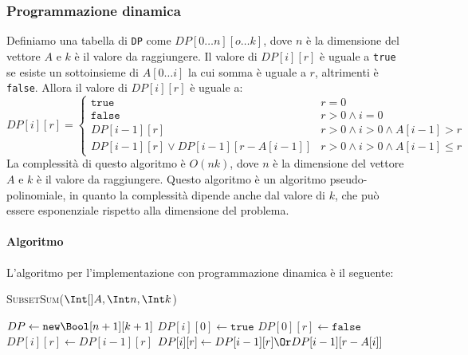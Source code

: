         \subsubsection{Programmazione dinamica}
            Definiamo una tabella di \texttt{DP} come $DP[0\dots n][o\dots k]$, dove $n$ è la dimensione del vettore $A$ e $k$ è il valore da raggiungere. Il valore di $DP[i][r]$ è uguale a \texttt{true} se esiste un sottoinsieme di $A[0\dots i]$ la cui somma è uguale a $r$, altrimenti è \texttt{false}. \newline
            Allora il valore di $DP[i][r]$ è uguale a:
            $$
                DP[i][r] = \begin{cases}
                    \texttt{true} & r=0\\
                    \texttt{false} & r>0 \land i=0\\
                    DP[i-1][r] & r>0 \land i>0 \land A[i-1]>r\\
                    DP[i-1][r] \lor DP[i-1][r-A[i-1]] & r>0 \land i>0 \land A[i-1]\leq r
                \end{cases}
            $$
            La complessità di questo algoritmo è $O(nk)$, dove $n$ è la dimensione del vettore $A$ e $k$ è il valore da raggiungere. Questo algoritmo è un algoritmo pseudo-polinomiale, in quanto la complessità dipende anche dal valore di $k$, che può essere esponenziale rispetto alla dimensione del problema.
            \paragraph{Algoritmo}
                L'algoritmo per l'implementazione con programmazione dinamica è il seguente:
                \begin{algorithm}[H]
                    \caption{\Bool \textsc{SubsetSum}($\Int[] A, \Int n, \Int k$)}
                    \begin{algorithmic}
                        \State \Bool[][] $DP \gets \texttt{new} \Bool[n+1][k+1]$
                            \State $DP[i][0] \gets \texttt{true}$
                        \EndFor
                            \State $DP[0][r] \gets \texttt{false}$
                        \EndFor
                                \State $DP[i][r] \gets DP[i-1][r]$
                            \EndFor 
                                \State $DP[i][r] \gets DP[i-1][r] \Or DP[i-1][r-A[i]]$
                            \EndFor
                        \EndFor
                    \end{algorithmic}
                \end{algorithm}
